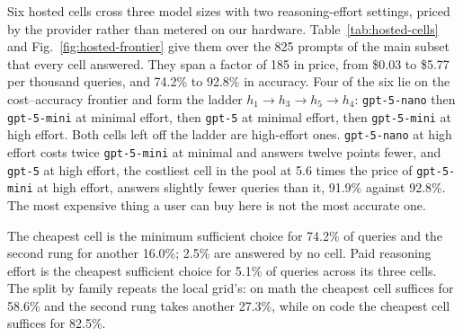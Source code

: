 \begin{table}[!t]
\caption{The six hosted cells: three model sizes crossed with two
reasoning efforts, on the prompts of the local main subset. Output tokens
include reasoning tokens, which the provider reports separately but bills
as output. A cap hit is a truncated generation, counted as a failure
exactly as a local cap hit is.}
\label{tab:hosted-cells}
\centering
{}
\end{table}

\begin{table}[!t]
\caption{Escalation policies on the hosted ladder under oracle detection,
in US dollars per 1{,}000 queries. The static rows are the ladder rungs
used alone. As on the public pool, a policy that answers fewer queries can
show a negative tax by underpaying through failure, so the tax is read
beside the solved column.}
\label{tab:hosted-tax}
\centering
{}
\end{table}

Six hosted cells cross three model sizes with two reasoning-effort
settings, priced by the provider rather than metered on our hardware.
Table~\ref{tab:hosted-cells} and Fig.~\ref{fig:hosted-frontier} give them
over the 825 prompts of the main subset that every cell answered. They
span a factor of 185 in price, from \$0.03 to \$5.77 per thousand queries,
and 74.2\% to 92.8\% in accuracy. Four of the six lie on the
cost--accuracy frontier and form the ladder $h_1 \rightarrow h_3
\rightarrow h_5 \rightarrow h_4$: \texttt{gpt-5-nano} then
\texttt{gpt-5-mini} at minimal effort, then \texttt{gpt-5} at minimal
effort, then \texttt{gpt-5-mini} at high effort. Both cells left off the
ladder are high-effort ones. \texttt{gpt-5-nano} at high effort costs
twice \texttt{gpt-5-mini} at minimal and answers twelve points fewer, and
\texttt{gpt-5} at high effort, the costliest cell in the pool at 5.6 times
the price of \texttt{gpt-5-mini} at high effort, answers slightly fewer
queries than it, 91.9\% against 92.8\%. The most expensive thing a user can
buy here is not the most accurate one.

The cheapest cell is the minimum sufficient choice for 74.2\% of queries
and the second rung for another 16.0\%; 2.5\% are answered by no cell.
Paid reasoning effort is the cheapest sufficient choice for 5.1\% of
queries across its three cells. The split by family repeats the local
grid's: on math the cheapest cell suffices for 58.6\% and the second rung
takes another 27.3\%, while on code the cheapest cell suffices for
82.5\%.

